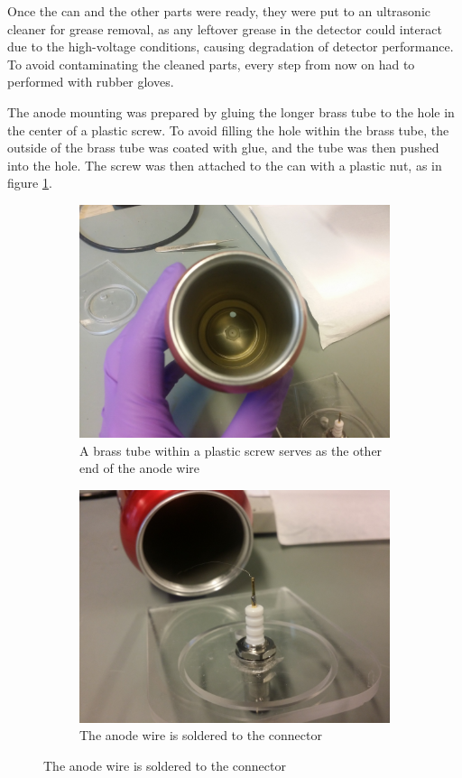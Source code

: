 \documentclass[a4paper]{article}
\begin{document}
Once the can and the other parts were ready, they were put to an ultrasonic cleaner for grease removal, as any leftover grease in the detector could interact due to the high-voltage conditions, causing degradation of detector performance.
To avoid contaminating the cleaned parts, every step from now on had to performed with rubber gloves.

The anode mounting was prepared by gluing the longer brass tube to the hole in the center of a plastic screw.
To avoid filling the hole within the brass tube, the outside of the brass tube was coated with glue, and the tube was then pushed into the hole.
The screw was then attached to the can with a plastic nut, as in figure \ref{fig:anode_mounting}.

\begin{figure}[ht!]
\centering
\begin{subfigure}[t]{0.48\textwidth}
\includegraphics[width=\textwidth]{fig/IMG_20201123_103327.jpg}
\caption{A brass tube within a plastic screw serves as the other end of the anode wire}
\label{fig:anode_mounting}
\end{subfigure}
%
\begin{subfigure}[t]{0.48\textwidth}
\includegraphics[width=\textwidth]{fig/IMG_20201117_121044.jpg}
\caption{The anode wire is soldered to the connector}
\label{fig:connector}
\end{subfigure}


\end{figure}
\end{document}
